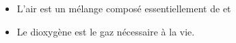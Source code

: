 \begin{mybilan}
	\begin{itemize}
		\item L'air est un mélange composé essentiellement de  et 
		\item Le dioxygène est le gaz nécessaire à la vie.
	\end{itemize}
\end{mybilan}